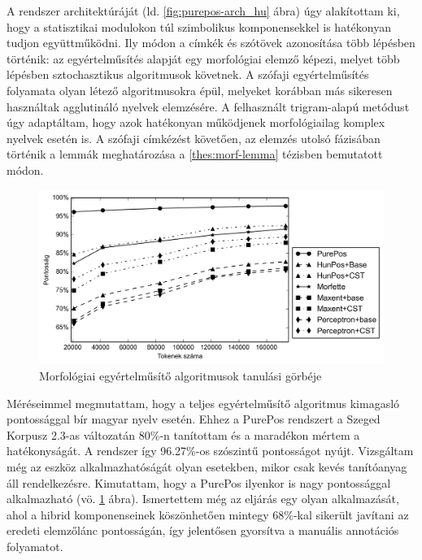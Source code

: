 A rendszer architektúráját  (ld. \ref{fig:purepos-arch_hu} ábra) úgy alakítottam ki, hogy a statisztikai modulokon túl szimbolikus komponensekkel is hatékonyan tudjon együttműködni. 
Ily módon a címkék és szótövek azonosítása több lépésben történik:
az egyértelműsítés alapját egy morfológiai elemző képezi, melyet több lépésben sztochasztikus algoritmusok követnek. 
A szófaji egyértelműsítés folyamata olyan létező algoritmusokra épül, melyeket korábban más sikeresen használtak agglutináló nyelvek elemzésére. 
A felhasznált trigram-alapú metódust úgy adaptáltam, hogy azok hatékonyan működjenek morfológiailag komplex nyelvek esetén is.
A szófaji címkézést követően, az elemzés utolsó fázisában történik a lemmák meghatározása a \ref{thes:morf-lemma} tézisben bemutatott módon.

\begin{figure}[H]
  \centering
  \includegraphics[width=1\textwidth]{MorphTagging/humor_token_hu.png}
  \caption{Morfológiai egyértelműsítő algoritmusok tanulási görbéje}
  \label{fig:humor-token_hu}
\end{figure}


Méréseimmel megmutattam, hogy a teljes egyértelműsítő algoritmus kimagasló pontossággal bír magyar nyelv esetén. 
Ehhez a PurePos rendszert a Szeged Korpusz 2.3-as változatán 80\%-n tanítottam és a maradékon mértem a hatékonyságát. 
A rendszer így 96.27\%-os szószintű pontosságot nyújt.
Vizsgáltam még az eszköz alkalmazhatóságát olyan esetekben, mikor csak kevés tanítóanyag áll rendelkezésre.
Kimutattam, hogy a PurePos ilyenkor is nagy pontossággal alkalmazható (vö. \ref{fig:humor-token_hu} ábra). 
Ismertettem még az eljárás egy olyan alkalmazását, ahol a hibrid komponenseinek köszönhetően mintegy 68\%-kal sikerült javítani az eredeti elemzőlánc pontosságán, így jelentősen gyorsítva a manuális annotációs folyamatot.


